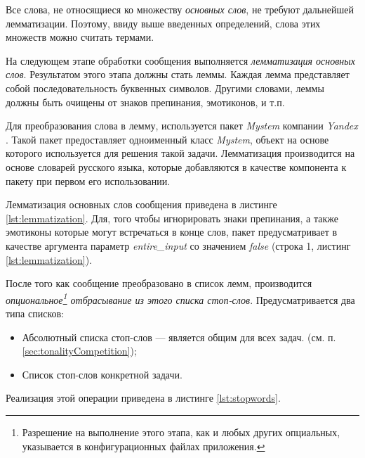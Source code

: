     Все слова, не относящиеся ко множеству {\it основных слов}, не требуют
    дальнейшей лемматизации. Поэтому, ввиду выше введенных определений, слова
    этих множеств можно считать термами.

    На следующем этапе обработки сообщения выполняется {\it лемматизация основных слов}.
    Результатом этого этапа должны стать леммы.
    Каждая лемма представляет собой последовательность буквенных символов.
    Другими словами, леммы должны быть очищены от знаков препинания, эмотиконов,
    и т.п.

    Для преобразования слова в лемму, используется пакет {\it Mystem} компании
    {\it Yandex} \cite{mystem}.
    Такой пакет предоставляет одноименный класс {\it Mystem}, объект на основе
    которого используется для решения такой задачи.
    Лемматизация производится на основе словарей русского языка, которые
    добавляются в качестве компонента к пакету при первом его использовании.

    Лемматизация основных слов сообщения приведена в листинге \ref{lst:lemmatization}.
    Для, того чтобы игнорировать знаки препинания, а также эмотиконы которые
    могут встречаться в конце слов, пакет предусматривает в качестве аргумента
    параметр {\it entire\_input} со значением {\it false} (строка 1, листинг
    \ref{lst:lemmatization}).

    \lstset{style=python}
    

    После того как сообщение преобразовано в список лемм, производится
    {\it опциональное\footnote{
            Разрешение на выполнение этого этапа, как и любых других опциальных,
            указывается в конфигурационных файлах приложения.
        }
    отбрасывание из этого списка стоп-слов}.
    Предусматривается два типа списков:
    \begin{itemize}
        \item Абсолютный списка стоп-слов --- является общим для всех задач.
            (см. п. \ref{sec:tonalityCompetition});
        \item Список стоп-слов конкретной задачи.
    \end{itemize}

    Реализация этой операции приведена в листинге \ref{lst:stopwords}.
    \lstset{style=python}
    

